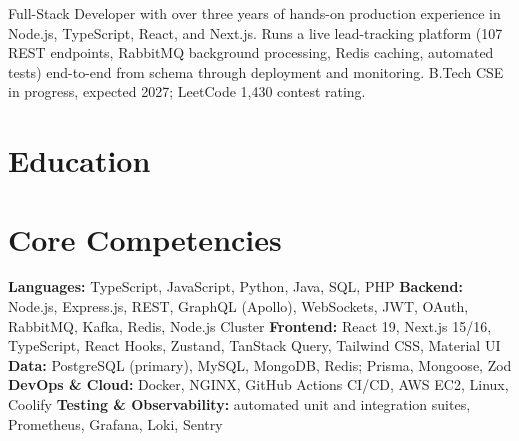 \documentclass[11pt,a4paper,sans]{moderncv}
\begin{document}
\makecvtitle


\vspace{4pt}
\small{Full-Stack Developer with over three years of hands-on production experience in Node.js, TypeScript, React, and Next.js. Runs a live lead-tracking platform (107 REST endpoints, RabbitMQ background processing, Redis caching, automated tests) end-to-end from schema through deployment and monitoring. B.Tech CSE in progress, expected 2027; LeetCode 1,430 contest rating.}


\section{Education}
\vspace{1pt}


\section{Core Competencies}
\vspace{1pt}
\raggedright
\textbf{Languages:} TypeScript, JavaScript, Python, Java, SQL, PHP \textbar{}
\textbf{Backend:} Node.js, Express.js, REST, GraphQL (Apollo), WebSockets, JWT, OAuth, RabbitMQ, Kafka, Redis, Node.js Cluster \textbar{}
\textbf{Frontend:} React 19, Next.js 15/16, TypeScript, React Hooks, Zustand, TanStack Query, Tailwind CSS, Material UI \textbar{}
\textbf{Data:} PostgreSQL (primary), MySQL, MongoDB, Redis; Prisma, Mongoose, Zod \textbar{}
\textbf{DevOps \& Cloud:} Docker, NGINX, GitHub Actions CI/CD, AWS EC2, Linux, Coolify \textbar{}
\textbf{Testing \& Observability:} automated unit and integration suites, Prometheus, Grafana, Loki, Sentry
\par\normalfont
\end{document}
